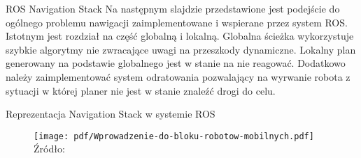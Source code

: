 \begin{frame}
{ROS Navigation Stack}
	Na następnym slajdzie przedstawione jest podejście do ogólnego problemu nawigacji zaimplementowane i wspierane przez system ROS. 
	Istotnym jest rozdział na część globalną i lokalną.
	Globalna ścieżka wykorzystuje szybkie algorytmy nie zwracające uwagi na przeszkody dynamiczne.
	Lokalny plan generowany na podstawie globalnego jest w stanie na nie reagować.
	Dodatkowo należy zaimplementować system odratowania pozwalający na wyrwanie robota z sytuacji w której planer nie jest w stanie znaleźć drogi do celu.
\end{frame}

\begin{frame}
{Reprezentacja Navigation Stack w systemie ROS}
	\begin{center}
		\begin{figure}
			\centering
			\texttt{[image: pdf/Wprowadzenie-do-bloku-robotow-mobilnych.pdf]}
			\hspace*{15pt}\hbox{\scriptsize{Źródło:}}
		\end{figure}
	\end{center}
\end{frame}